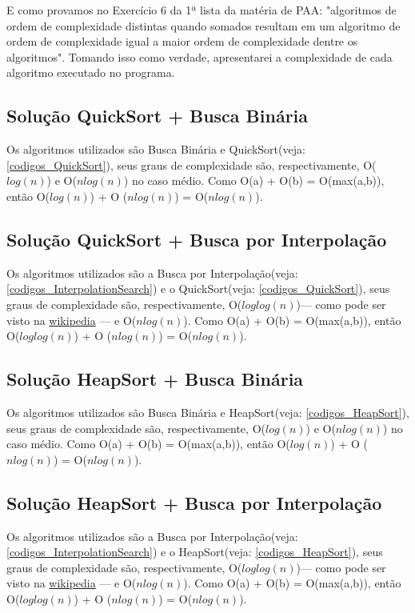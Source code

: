 \documentclass[12pt]{article}
\begin{document}
        E como provamos no Exercício 6 da 1ª lista da matéria de PAA: "algoritmos de ordem de complexidade distintas quando somados resultam em um algoritmo de ordem de complexidade igual a maior ordem de complexidade dentre os algoritmos". Tomando isso como verdade, apresentarei a complexidade de cada algoritmo executado no programa.
        \subsection{Solução QuickSort + Busca Binária}
            Os algoritmos utilizados são Busca Binária e QuickSort(veja: \ref{codigos_QuickSort}), seus graus de complexidade são, respectivamente, O($log(n)$) e O($nlog(n)$) no caso médio. Como O(a) + O(b) = O(max(a,b)), então O($log(n)$) + O ($nlog(n)$) = O($nlog(n)$).
            
        \subsection{Solução QuickSort + Busca por Interpolação}
            Os algoritmos utilizados são a Busca por Interpolação(veja: \ref{codigos_InterpolationSearch}) e o QuickSort(veja: \ref{codigos_QuickSort}), seus graus de complexidade são, respectivamente, O($loglog(n)$)--- como pode ser visto na \href{https://en.wikipedia.org/wiki/Interpolation_search}{wikipedia} --- e O($nlog(n)$). Como O(a) + O(b) = O(max(a,b)), então O($loglog(n)$) + O ($nlog(n)$) = O($nlog(n)$).
            
        \subsection{Solução HeapSort + Busca Binária}
            Os algoritmos utilizados são Busca Binária e HeapSort(veja: \ref{codigos_HeapSort}), seus graus de complexidade são, respectivamente, O($log(n)$) e O($nlog(n)$) no caso médio. Como O(a) + O(b) = O(max(a,b)), então O($log(n)$) + O ($nlog(n)$) = O($nlog(n)$).
            
        \subsection{Solução HeapSort + Busca por Interpolação}
            Os algoritmos utilizados são a Busca por Interpolação(veja: \ref{codigos_InterpolationSearch}) e o HeapSort(veja: \ref{codigos_HeapSort}), seus graus de complexidade são, respectivamente, O($loglog(n)$)--- como pode ser visto na \href{https://en.wikipedia.org/wiki/Interpolation_search}{wikipedia} --- e O($nlog(n)$). Como O(a) + O(b) = O(max(a,b)), então O($loglog(n)$) + O ($nlog(n)$) = O($nlog(n)$).
            
\end{document}
